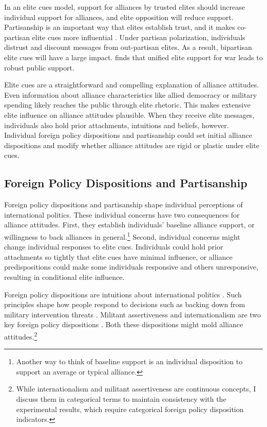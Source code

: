 \documentclass[12pt]{article}
\begin{document}
In an elite cues model, support for alliances by trusted elites should increase individual support for alliances, and elite opposition will reduce support.   
Partisanship is an important way that elites establish trust, and it makes co-partisan elite cues more influential \citep{Druckmanetal2013}.
Under partisan polarization, individuals distrust and discount messages from out-partisan elites. 
As a result, bipartisan elite cues will have a large impact.
\citet{Berinsky2007} finds that unified elite support for war leads to robust public support. 


Elite cues are a straightforward and compelling explanation of alliance attitudes.
Even information about alliance characteristics like allied democracy or military spending likely reaches the public through elite rhetoric. 
This makes extensive elite influence on alliance attitudes plausible. 
When they receive elite messages, individuals also hold prior attachments, intuitions and beliefs, however.
Individual foreign policy dispositions and partisanship could set initial alliance dispositions and modify whether alliance attitudes are rigid or plastic under elite cues. 


\subsection{Foreign Policy Dispositions and Partisanship}


Foreign policy dispositions and partisanship shape individual perceptions of international politics. 
These individual concerns have two consequences for alliance attitudes. 
First, they establish individuals' baseline alliance support, or willingness to back alliances in general.\footnote{Another way to think of baseline support is an individual disposition to support an average or typical alliance.} 
Second, individual concerns might change individual responses to elite cues. 
Individuals could hold prior attachments so tightly that elite cues have minimal influence, or alliance predispositions could make some individuals responsive and others unresponsive, resulting in conditional elite influence.


Foreign policy dispositions are intuitions about international politics \citep{KertzerTingley2018}. 
Such principles shape how people respond to decisions such as backing down from military intervention threats \citep{KertzerBrutger2016}. 
Militant assertiveness and internationalism are two key foreign policy dispositions \citep{Herrmannetal1999}.
Both these dispositions might mold alliance attitudes.\footnote{While internationalism and militant assertiveness are continuous concepts, I discuss them in categorical terms to maintain consistency with the experimental results, which require categorical foreign policy disposition indicators.}
\end{document}
